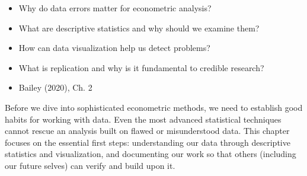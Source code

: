 \documentclass[
  letterpaper,
  DIV=11,
  numbers=noendperiod]{scrreprt}
\providecommand{\tightlist}{%
  \setlength{\itemsep}{0pt}\setlength{\parskip}{0pt}}
\begin{document}
\begin{tcolorbox}[enhanced jigsaw, arc=.35mm, bottomrule=.15mm, bottomtitle=1mm, breakable, colback=white, colbacktitle=quarto-callout-tip-color!10!white, colframe=quarto-callout-tip-color-frame, coltitle=black, left=2mm, leftrule=.75mm, opacityback=0, opacitybacktitle=0.6, rightrule=.15mm, title=\textcolor{quarto-callout-tip-color}{\faLightbulb}\hspace{0.5em}{\textbf{Key Questions}}, titlerule=0mm, toprule=.15mm, toptitle=1mm]

\begin{itemize}
\tightlist
\item
  Why do data errors matter for econometric analysis?
\item
  What are descriptive statistics and why should we examine them?
\item
  How can data visualization help us detect problems?
\item
  What is replication and why is it fundamental to credible research?
\end{itemize}

\end{tcolorbox}

\begin{tcolorbox}[enhanced jigsaw, arc=.35mm, bottomrule=.15mm, bottomtitle=1mm, breakable, colback=white, colbacktitle=quarto-callout-note-color!10!white, colframe=quarto-callout-note-color-frame, coltitle=black, left=2mm, leftrule=.75mm, opacityback=0, opacitybacktitle=0.6, rightrule=.15mm, title=\textcolor{quarto-callout-note-color}{\faInfo}\hspace{0.5em}{\textbf{Suggested Readings}}, titlerule=0mm, toprule=.15mm, toptitle=1mm]

\begin{itemize}
\tightlist
\item
  Bailey (2020), Ch. 2
\end{itemize}

\end{tcolorbox}

Before we dive into sophisticated econometric methods, we need to
establish good habits for working with data. Even the most advanced
statistical techniques cannot rescue an analysis built on flawed or
misunderstood data. This chapter focuses on the essential first steps:
understanding our data through descriptive statistics and visualization,
and documenting our work so that others (including our future selves)
can verify and build upon it.
\end{document}
